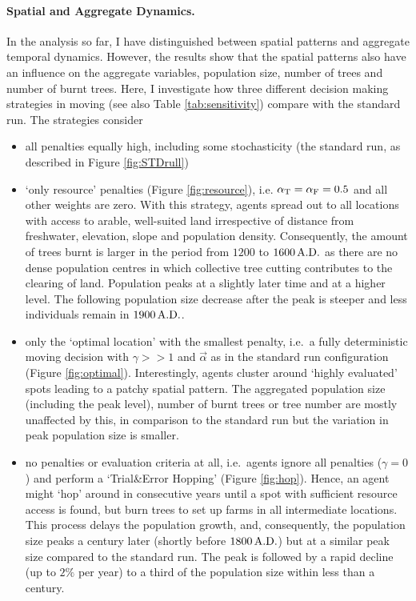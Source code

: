 \paragraph{Spatial and Aggregate Dynamics.}
In the analysis so far, I have distinguished between spatial patterns and aggregate temporal dynamics.
However, the results show that the spatial patterns also have an influence on the aggregate variables, population size, number of trees and number of burnt trees.
Here, I investigate how three different decision making strategies in moving (see also Table \ref{tab:sensitivity}) compare with the standard run. The strategies consider
\begin{itemize}
	\item all penalties equally high, including some stochasticity (the standard run, as described in Figure \ref{fig:STDrull}) 
	\item `only resource' penalties (Figure \ref{fig:resource}), i.e. $\alpha_{\rm T}= \alpha_{\rm F} = 0.5$ and all other weights are zero.
	With this strategy, agents spread out to all locations with access to arable, well-suited land irrespective of distance from freshwater, elevation, slope and population density.
	Consequently, the amount of trees burnt is larger in the period from $1200$ to $1600\, {\rm A.D.}$ as there are no dense population centres in which collective tree cutting contributes to the clearing of land. 
	Population peaks at a slightly later time and at a higher level. 
	The following population size decrease after the peak is steeper and less individuals remain in $1900\, {\rm A.D.}$.
	\item only the `optimal location' with the smallest penalty, i.e.\ a fully deterministic moving decision with $\gamma>>1$ and $\vec{\alpha}$ as in the standard run configuration (Figure \ref{fig:optimal}).
	Interestingly, agents cluster around `highly evaluated' spots leading to a patchy spatial pattern. The aggregated population size (including the peak level), number of burnt trees or tree number are mostly unaffected by this, in comparison to the standard run but the variation in peak population size is smaller.
	\item no penalties or evaluation criteria at all, i.e.\ agents ignore all penalties ($\gamma = 0$) and perform a `Trial\&Error Hopping' (Figure \ref{fig:hop}).
	Hence, an agent might `hop' around in consecutive years until a spot with sufficient resource access is found, but burn trees to set up farms in all intermediate locations.
	This process delays the population growth, and, consequently, the population size peaks a century later (shortly before $1800\, {\rm A.D.}$) but at a similar peak size compared to the standard run. The peak is followed by a rapid decline (up to $2\%$ per year) to a third of the population size within less than a century.
\end{itemize}
